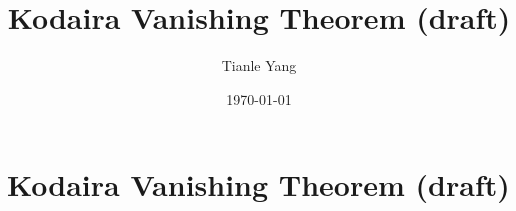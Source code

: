 \documentclass{noteformyself}
\title{Kodaira Vanishing Theorem (draft)}
\author{Tianle Yang}
\date{\today}
\begin{document}
    \maketitle

    \section{Kodaira Vanishing Theorem (draft)}


    \printbibliography[heading=bibintoc, title={References}]
\end{document}
